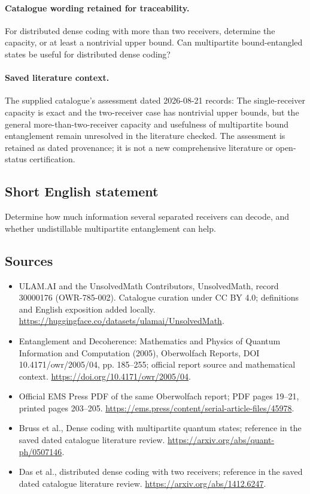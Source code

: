 \documentclass[11pt]{article}
\begin{document}
\paragraph{Catalogue wording retained for traceability.}
For distributed dense coding with more than two receivers, determine the capacity, or at least a nontrivial upper bound. Can multipartite bound-entangled states be useful for distributed dense coding?

\paragraph{Saved literature context.} The supplied catalogue's assessment dated 2026-08-21 records: The single-receiver capacity is exact and the two-receiver case has nontrivial upper bounds, but the general more-than-two-receiver capacity and usefulness of multipartite bound entanglement remain unresolved in the literature checked. The assessment is retained as dated provenance; it is not a new comprehensive literature or open-status certification.
\subsection{Short English statement}
Determine how much information several separated receivers can decode, and whether undistillable multipartite entanglement can help.
\subsection{Sources}
\begin{itemize}
\item[\hypertarget{source:30000176:1}{S1}] ULAM.AI and the UnsolvedMath Contributors, UnsolvedMath, record 30000176 (OWR-785-002). Catalogue curation under CC BY 4.0; definitions and English exposition added locally.
\url{https://huggingface.co/datasets/ulamai/UnsolvedMath}.
\item[\hypertarget{source:30000176:2}{S2}] Entanglement and Decoherence: Mathematics and Physics of Quantum Information and Computation (2005), Oberwolfach Reports, DOI 10.4171/owr/2005/04, pp. 185--255; official report source and mathematical context.
\url{https://doi.org/10.4171/owr/2005/04}.
\item[\hypertarget{source:30000176:3}{S3}] Official EMS Press PDF of the same Oberwolfach report; PDF pages 19--21, printed pages 203--205.
\url{https://ems.press/content/serial-article-files/45978}.
\item[\hypertarget{source:30000176:4}{S4}] Bruss et al., Dense coding with multipartite quantum states; reference in the saved dated catalogue literature review.
\url{https://arxiv.org/abs/quant-ph/0507146}.
\item[\hypertarget{source:30000176:5}{S5}] Das et al., distributed dense coding with two receivers; reference in the saved dated catalogue literature review.
\url{https://arxiv.org/abs/1412.6247}.
\end{itemize}
\label{end:30000176}
\end{document}
